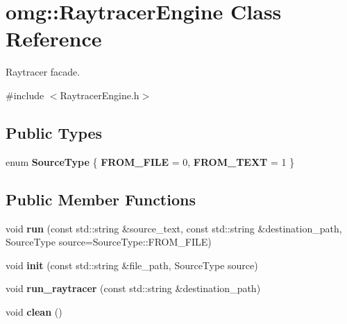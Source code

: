 \hypertarget{classomg_1_1_raytracer_engine}{}\section{omg\+::Raytracer\+Engine Class Reference}
\label{classomg_1_1_raytracer_engine}


Raytracer facade.  




{\ttfamily \#include $<$Raytracer\+Engine.\+h$>$}

\subsection*{Public Types}
\begin{DoxyCompactItemize}
\item 
\mbox{\label{classomg_1_1_raytracer_engine_ae5f2a431ac187584cc1eac2d4ec09140}} 
enum {\bfseries Source\+Type} \{ {\bfseries F\+R\+O\+M\+\_\+\+F\+I\+LE} = 0, 
{\bfseries F\+R\+O\+M\+\_\+\+T\+E\+XT} = 1
 \}
\end{DoxyCompactItemize}
\subsection*{Public Member Functions}
\begin{DoxyCompactItemize}
\item 
\mbox{\label{classomg_1_1_raytracer_engine_aa38fbd79d303fc1dd8bc7957fd8b2fba}} 
void {\bfseries run} (const std\+::string \&source\+\_\+text, const std\+::string \&destination\+\_\+path, Source\+Type source=Source\+Type\+::\+F\+R\+O\+M\+\_\+\+F\+I\+LE)
\item 
\mbox{\label{classomg_1_1_raytracer_engine_a38f6a68330403c83e6a03671939afadc}} 
void {\bfseries init} (const std\+::string \&file\+\_\+path, Source\+Type source)
\item 
\mbox{\label{classomg_1_1_raytracer_engine_af2d1a3cdd99068161062bdeebb9ad410}} 
void {\bfseries run\+\_\+raytracer} (const std\+::string \&destination\+\_\+path)
\item 
\mbox{\label{classomg_1_1_raytracer_engine_aea20f9b8fac6901e0428f2ce43069923}} 
void {\bfseries clean} ()
\end{DoxyCompactItemize}
